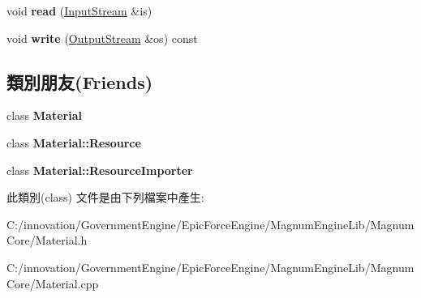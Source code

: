 \begin{DoxyCompactItemize}
\item 
void {\bfseries read} (\hyperlink{class_i_dream_sky_1_1_input_stream}{Input\+Stream} \&is)\hypertarget{class_i_dream_sky_1_1_material_1_1_data_ab2ff7d3f90fb1ca4cb06212778f043d1}{}\label{class_i_dream_sky_1_1_material_1_1_data_ab2ff7d3f90fb1ca4cb06212778f043d1}

\item 
void {\bfseries write} (\hyperlink{class_i_dream_sky_1_1_output_stream}{Output\+Stream} \&os) const \hypertarget{class_i_dream_sky_1_1_material_1_1_data_a12a13caf680e73f32acfc3240f8707e0}{}\label{class_i_dream_sky_1_1_material_1_1_data_a12a13caf680e73f32acfc3240f8707e0}

\end{DoxyCompactItemize}
\subsection*{類別朋友(Friends)}
\begin{DoxyCompactItemize}
\item 
class {\bfseries Material}\hypertarget{class_i_dream_sky_1_1_material_1_1_data_aa1212b6e372a0f45d2c01f3cd203af77}{}\label{class_i_dream_sky_1_1_material_1_1_data_aa1212b6e372a0f45d2c01f3cd203af77}

\item 
class {\bfseries Material\+::\+Resource}\hypertarget{class_i_dream_sky_1_1_material_1_1_data_a6a002bcee6c883089769545352e9ccbd}{}\label{class_i_dream_sky_1_1_material_1_1_data_a6a002bcee6c883089769545352e9ccbd}

\item 
class {\bfseries Material\+::\+Resource\+Importer}\hypertarget{class_i_dream_sky_1_1_material_1_1_data_a941a71e735085112a8496c27836506ee}{}\label{class_i_dream_sky_1_1_material_1_1_data_a941a71e735085112a8496c27836506ee}

\end{DoxyCompactItemize}


此類別(class) 文件是由下列檔案中產生\+:\begin{DoxyCompactItemize}
\item 
C\+:/innovation/\+Government\+Engine/\+Epic\+Force\+Engine/\+Magnum\+Engine\+Lib/\+Magnum\+Core/Material.\+h\item 
C\+:/innovation/\+Government\+Engine/\+Epic\+Force\+Engine/\+Magnum\+Engine\+Lib/\+Magnum\+Core/Material.\+cpp\end{DoxyCompactItemize}
